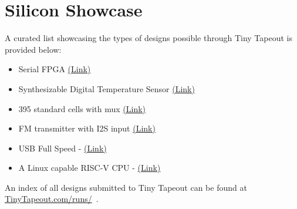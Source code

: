 \section{Silicon Showcase}
\label{sec:silicon_showcase}

A curated list showcasing the types of designs possible through Tiny Tapeout is provided below:

\begin{itemize}
    \item Serial FPGA \href{https://tinytapeout.com/runs/tt02/006/}{(Link)}
    \item Synthesizable Digital Temperature Sensor \href{https://tinytapeout.com/runs/tt03/047/}{(Link)}
    \item 395 standard cells with mux \href{https://tinytapeout.com/runs/tt03/045/}{(Link)}
    \item FM transmitter with I2S input \href{https://tinytapeout.com/runs/tt04/195/}{(Link)}
    \item USB Full Speed - \href{https://tinytapeout.com/runs/tt04/054/}{(Link)}
    \item A Linux capable RISC-V CPU - \href{https://tinytapeout.com/runs/tt05/654/}{(Link)}
\end{itemize}

An index of all designs submitted to Tiny Tapeout can be found at \url{TinyTapeout.com/runs/}~\cite{tinytapeoutruns}.
